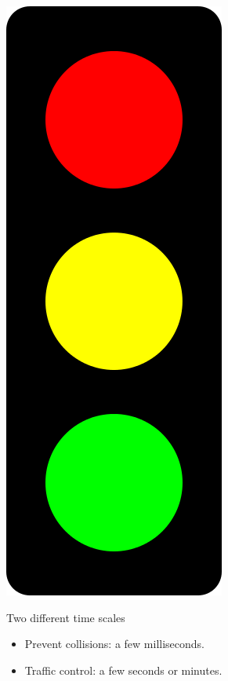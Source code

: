 \documentclass[utf8,xcolor=table, page number]{earlywinter}
\begin{document}
\begin{frame}
\begin{minipage}[l]{0.2\linewidth}
\begin{center}
    \includegraphics[width=0.7\linewidth]{trafficlight.png}
  \end{center}
  \end{minipage}

  \begin{exampleblock}{Two different time scales}
    \begin{itemize}
    \item Prevent collisions: a few milliseconds.
    \item Traffic control: a few seconds or minutes.
    \end{itemize}
  \end{exampleblock}
\end{frame}
\end{document}
